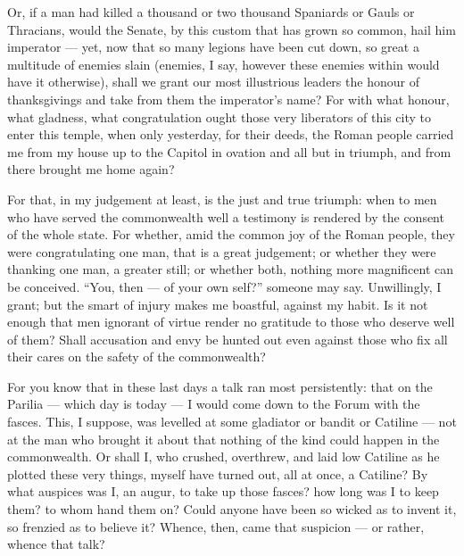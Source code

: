 Or, if a man had killed a thousand or two thousand Spaniards or Gauls or Thracians, would the Senate, by this custom that has grown so common, hail him imperator --- yet, now that so many legions have been cut down, so great a multitude of enemies slain (enemies, I say, however these enemies within would have it otherwise), shall we grant our most illustrious leaders the honour of thanksgivings and take from them the imperator's name? For with what honour, what gladness, what congratulation ought those very liberators of this city to enter this temple, when only yesterday, for their deeds, the Roman people carried me from my house up to the Capitol in ovation and all but in triumph, and from there brought me home again?

 For that, in my judgement at least, is the just and true triumph: when to men who have served the commonwealth well a testimony is rendered by the consent of the whole state. For whether, amid the common joy of the Roman people, they were congratulating one man, that is a great judgement; or whether they were thanking one man, a greater still; or whether both, nothing more magnificent can be conceived. ``You, then --- of your own self?'' someone may say. Unwillingly, I grant; but the smart of injury makes me boastful, against my habit. Is it not enough that men ignorant of virtue render no gratitude to those who deserve well of them? Shall accusation and envy be hunted out even against those who fix all their cares on the safety of the commonwealth?

 For you know that in these last days a talk ran most persistently: that on the Parilia --- which day is today --- I would come down to the Forum with the fasces. This, I suppose, was levelled at some gladiator or bandit or Catiline --- not at the man who brought it about that nothing of the kind could happen in the commonwealth. Or shall I, who crushed, overthrew, and laid low Catiline as he plotted these very things, myself have turned out, all at once, a Catiline? By what auspices was I, an augur, to take up those fasces? how long was I to keep them? to whom hand them on? Could anyone have been so wicked as to invent it, so frenzied as to believe it? Whence, then, came that suspicion --- or rather, whence that talk?

